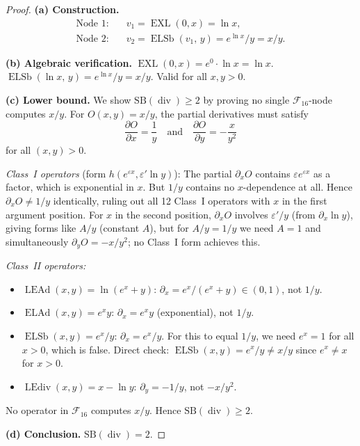 \documentclass[12pt,a4paper]{article}
\theoremstyle{definition}
\newcommand{\EXL}{\operatorname{EXL}}
\newcommand{\ELAd}{\operatorname{ELAd}}
\newcommand{\ELSb}{\operatorname{ELSb}}
\newcommand{\LEAd}{\operatorname{LEAd}}
\newcommand{\LEdiv}{\operatorname{LEdiv}}
\newcommand{\divop}{\operatorname{div}}
\newcommand{\SB}{\mathrm{SB}}
\newcommand{\F}{\mathcal{F}_{16}}
\begin{document}
\begin{proof}
\textbf{(a) Construction.}
\begin{align*}
  \text{Node 1:} &\quad v_1 = \EXL(0,x) = \ln x, \\
  \text{Node 2:} &\quad v_2 = \ELSb(v_1,\,y) = e^{\ln x}/y = x/y.
\end{align*}

\textbf{(b) Algebraic verification.}
$\EXL(0,x) = e^0 \cdot \ln x = \ln x$.
$\ELSb(\ln x,\,y) = e^{\ln x}/y = x/y$.  Valid for all $x,y>0$.

\textbf{(c) Lower bound.}
We show $\SB(\divop) \ge 2$ by proving no single $\F$-node computes $x/y$.
For $O(x,y) = x/y$, the partial derivatives must satisfy
\[
  \frac{\partial O}{\partial x} = \frac{1}{y} \quad\text{and}\quad
  \frac{\partial O}{\partial y} = -\frac{x}{y^2}
\]
for all $(x,y) > 0$.

\emph{Class~I operators} (form $h(e^{\varepsilon x}, \varepsilon'\ln y)$):
The partial $\partial_x O$ contains $\varepsilon e^{\varepsilon x}$ as a factor,
which is exponential in $x$.  But $1/y$ contains no $x$-dependence at all.
Hence $\partial_x O \ne 1/y$ identically, ruling out all 12 Class~I operators
with $x$ in the first argument position.  For $x$ in the second position,
$\partial_x O$ involves $\varepsilon'/y$ (from $\partial_x \ln y$), giving
forms like $A/y$ (constant $A$), but for $A/y = 1/y$ we need $A=1$ and
simultaneously $\partial_y O = -x/y^2$; no Class~I form achieves this.

\emph{Class~II operators:}
\begin{itemize}
  \item $\LEAd(x,y) = \ln(e^x+y)$:\; $\partial_x = e^x/(e^x+y) \in (0,1)$,
    not $1/y$.
  \item $\ELAd(x,y) = e^x y$:\; $\partial_x = e^x y$ (exponential), not $1/y$.
  \item $\ELSb(x,y) = e^x/y$:\; $\partial_x = e^x/y$.  For this to equal
    $1/y$, we need $e^x = 1$ for all $x>0$, which is false.
    Direct check: $\ELSb(x,y) = e^x/y \ne x/y$ since $e^x \ne x$ for $x>0$.
  \item $\LEdiv(x,y) = x - \ln y$:\; $\partial_y = -1/y$, not $-x/y^2$.
\end{itemize}
No operator in $\F$ computes $x/y$.  Hence $\SB(\divop) \ge 2$.

\textbf{(d) Conclusion.} $\SB(\divop) = 2$.
\end{proof}

\end{document}
